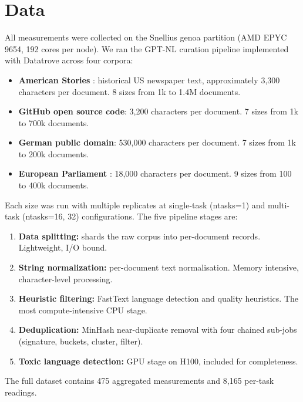 \documentclass[12pt,a4paper]{article}
\begin{document}
\section{Data}
\label{sec:data}

All measurements were collected on the Snellius genoa partition (AMD EPYC 9654, 192 cores per node). We ran the GPT-NL curation pipeline \cite{gptnl_architecture} implemented with Datatrove \cite{datatrove} across four corpora:

\begin{itemize}
  \item \textbf{American Stories} \cite{american_stories}: historical US newspaper text, approximately 3,300 characters per document. 8 sizes from 1k to 1.4M documents.
  \item \textbf{GitHub open source code}: 3,200 characters per document. 7 sizes from 1k to 700k documents.
  \item \textbf{German public domain}: 530,000 characters per document. 7 sizes from 1k to 200k documents.
  \item \textbf{European Parliament} \cite{koehn2005europarl}: 18,000 characters per document. 9 sizes from 100 to 400k documents.
\end{itemize}

Each size was run with multiple replicates at single-task (ntasks=1) and multi-task (ntasks=16, 32) configurations. The five pipeline stages are:

\begin{enumerate}
  \item \textbf{Data splitting:} shards the raw corpus into per-document records. Lightweight, I/O bound.
  \item \textbf{String normalization:} per-document text normalisation. Memory intensive, character-level processing.
  \item \textbf{Heuristic filtering:} FastText language detection and quality heuristics. The most compute-intensive CPU stage.
  \item \textbf{Deduplication:} MinHash near-duplicate removal with four chained sub-jobs (signature, buckets, cluster, filter).
  \item \textbf{Toxic language detection:} GPU stage on H100, included for completeness.
\end{enumerate}

The full dataset contains 475 aggregated measurements and 8,165 per-task readings.
\end{document}

